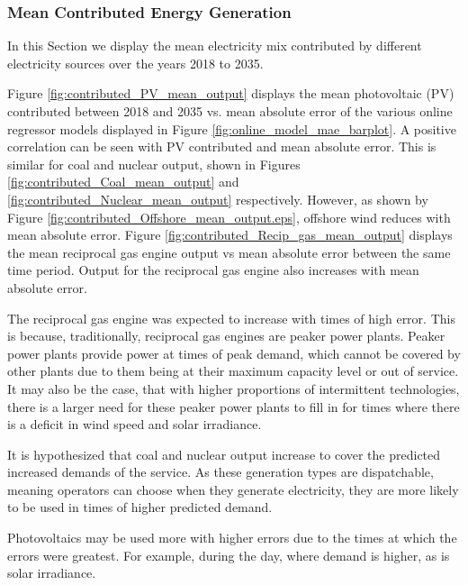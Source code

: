 \documentclass[final,3p,times,twocolumn,numbers]{elsarticle}
\begin{document}
\subsubsection{Mean Contributed Energy Generation}


In this Section we display the mean electricity mix contributed by different electricity sources over the years 2018 to 2035. 

Figure \ref{fig:contributed_PV_mean_output} displays the mean photovoltaic (PV) contributed between 2018 and 2035 vs. mean absolute error of the various online regressor models displayed in Figure \ref{fig:online_model_mae_barplot}. A positive correlation can be seen with PV contributed and mean absolute error. This is similar for coal and nuclear output, shown in Figures \ref{fig:contributed_Coal_mean_output} and \ref{fig:contributed_Nuclear_mean_output} respectively. However, as shown by Figure \ref{fig:contributed_Offshore_mean_output.eps}, offshore wind reduces with mean absolute error. Figure \ref{fig:contributed_Recip_gas_mean_output} displays the mean reciprocal gas engine output vs mean absolute error between the same time period. Output for the reciprocal gas engine also increases with mean absolute error.

The reciprocal gas engine was expected to increase with times of high error. This is because, traditionally, reciprocal gas engines are peaker power plants. Peaker power plants provide power at times of peak demand, which cannot be covered by other plants due to them being at their maximum capacity level or out of service. It may also be the case, that with higher proportions of intermittent technologies, there is a larger need for these peaker power plants to fill in for times where there is a deficit in wind speed and solar irradiance.

It is hypothesized that coal and nuclear output increase to cover the predicted increased demands of the service. As these generation types are dispatchable, meaning operators can choose when they generate electricity, they are more likely to be used in times of higher predicted demand.

Photovoltaics may be used more with higher errors due to the times at which the errors were greatest. For example, during the day, where demand is higher, as is solar irradiance.
\end{document}
